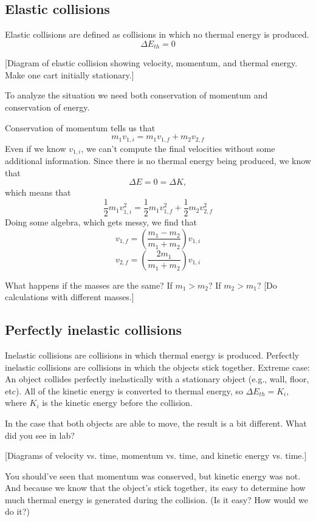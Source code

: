\subsection{Elastic collisions}
Elastic collisions are defined as collisions in which no thermal energy is produced.
$$\boxed{\Delta E_{th}=0}$$

[Diagram of elastic collision showing velocity, momentum, and thermal energy. Make one cart initially stationary.]
\vspace{4cm}

To analyze the situation we need both conservation of momentum and conservation of energy.

Conservation of momentum tells us that
$$m_1v_{1,i} = m_1v_{1,f} + m_2v_{2,f}$$
Even if we know $v_{1,i}$, we can't compute the final velocities without some additional information. Since there is no thermal energy being produced, we know that
$$\Delta E = 0 = \Delta K,$$
which means that
$$\frac{1}{2}m_1v_{1,i}^2 = \frac{1}{2}m_1v_{1,f}^2 + \frac{1}{2}m_2v_{2,f}^2$$
Doing some algebra, which gets messy, we find that
$$\boxed{v_{1,f} = \left(\frac{m_1-m_2}{m_1+m_2}\right)v_{1,i}}$$
$$\boxed{v_{2,f} = \left(\frac{2m_1}{m_1+m_2}\right)v_{1,i}}$$

What happens if the masses are the same? If $m_1>m_2$? If $m_2>m_1$? [Do calculations with different masses.]

\subsection{Perfectly inelastic collisions}
Inelastic collisions are collisions in which thermal energy is produced. Perfectly inelastic collisions are collisions in which the objects stick together. Extreme case: An object collides perfectly inelastically with a stationary object (e.g., wall, floor, etc). All of the kinetic energy is converted to thermal energy, so $\Delta{E_{th}}=K_i$, where $K_i$ is the kinetic energy before the collision. 

In the case that both objects are able to move, the result is a bit different. What did you see in lab?

[Diagrams of velocity vs. time, momentum vs. time, and kinetic energy vs. time.]
\vspace{8cm}

You should've seen that momentum was conserved, but kinetic energy was not. And because we know that the object's stick together, its easy to determine how much thermal energy is generated during the collision. (Is it easy? How would we do it?)

